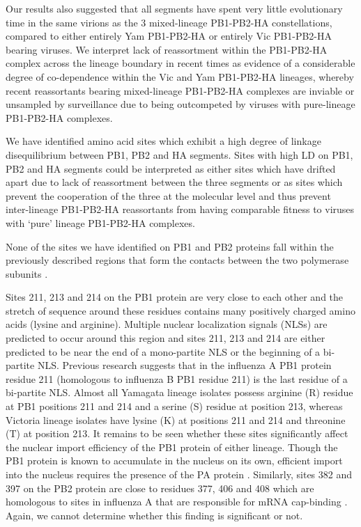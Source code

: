\documentclass[11pt,oneside,letterpaper]{article}
\begin{document}
Our results also suggested that all segments have spent very little evolutionary time in the same virions as the 3 mixed-lineage PB1-PB2-HA constellations, compared to either entirely Yam PB1-PB2-HA or entirely Vic PB1-PB2-HA bearing viruses.
We interpret lack of reassortment within the PB1-PB2-HA complex across the lineage boundary in recent times as evidence of a considerable degree of co-dependence within the Vic and Yam PB1-PB2-HA lineages, whereby recent reassortants bearing mixed-lineage PB1-PB2-HA complexes are inviable or unsampled by surveillance due to being outcompeted by viruses with pure-lineage PB1-PB2-HA complexes.

We have identified amino acid sites which exhibit a high degree of linkage disequilibrium between PB1, PB2 and HA segments.
Sites with high LD on PB1, PB2 and HA segments could be interpreted as either sites which have drifted apart due to lack of reassortment between the three segments or as sites which prevent the cooperation of the three at the molecular level and thus prevent inter-lineage PB1-PB2-HA reassortants from having comparable fitness to viruses with `pure' lineage PB1-PB2-HA complexes.

None of the sites we have identified on PB1 and PB2 proteins fall within the previously described regions that form the contacts between the two polymerase subunits \cite{sugiyama2009}.

Sites 211, 213 and 214 on the PB1 protein are very close to each other and the stretch of sequence around these residues contains many positively charged amino acids (lysine and arginine).
Multiple nuclear localization signals (NLSs) are predicted to occur around this region and sites 211, 213 and 214 are either predicted to be near the end of a mono-partite NLS or the beginning of a bi-partite NLS.
Previous research \cite{nath1990} suggests that in the influenza A PB1 protein residue 211 (homologous to influenza B PB1 residue 211) is the last residue of a bi-partite NLS.
Almost all Yamagata lineage isolates possess arginine (R) residue at PB1 positions 211 and 214 and a serine (S) residue at position 213, whereas Victoria lineage isolates have lysine (K) at positions 211 and 214 and threonine (T) at position 213.
It remains to be seen whether these sites significantly affect the nuclear import efficiency of the PB1 protein of either lineage.
Though the PB1 protein is known to accumulate in the nucleus on its own, efficient import into the nucleus requires the presence of the PA protein \cite{fodor2004}.
Similarly, sites 382 and 397 on the PB2 protein are close to residues 377, 406 and 408 which are homologous to sites in influenza A that are responsible for mRNA cap-binding \cite{guilligay2008}.
Again, we cannot determine whether this finding is significant or not.
\end{document}
